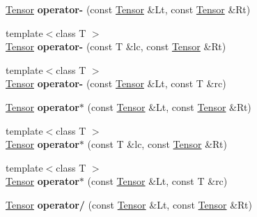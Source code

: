 \begin{DoxyCompactItemize}
\mbox{\label{namespacecytnx_a5a476408cdb97a10fa2330a5d6b4934c}} 
\hyperlink{classcytnx_1_1Tensor}{Tensor} {\bfseries operator-\/} (const \hyperlink{classcytnx_1_1Tensor}{Tensor} \&Lt, const \hyperlink{classcytnx_1_1Tensor}{Tensor} \&Rt)
\item 
\mbox{\label{namespacecytnx_a7c7bcfb0e14ec9e5317e686b955ea548}} 
{\footnotesize template$<$class T $>$ }\\\hyperlink{classcytnx_1_1Tensor}{Tensor} {\bfseries operator-\/} (const T \&lc, const \hyperlink{classcytnx_1_1Tensor}{Tensor} \&Rt)
\item 
\mbox{\label{namespacecytnx_a7c77b1fa99bea6e243e7e1dab2cb15ab}} 
{\footnotesize template$<$class T $>$ }\\\hyperlink{classcytnx_1_1Tensor}{Tensor} {\bfseries operator-\/} (const \hyperlink{classcytnx_1_1Tensor}{Tensor} \&Lt, const T \&rc)
\item 
\mbox{\label{namespacecytnx_ad579dd62bafd8261a0192a108b0f4b1b}} 
\hyperlink{classcytnx_1_1Tensor}{Tensor} {\bfseries operator$\ast$} (const \hyperlink{classcytnx_1_1Tensor}{Tensor} \&Lt, const \hyperlink{classcytnx_1_1Tensor}{Tensor} \&Rt)
\item 
\mbox{\label{namespacecytnx_ae1925a88cc713abd7d25ad548b7f7c22}} 
{\footnotesize template$<$class T $>$ }\\\hyperlink{classcytnx_1_1Tensor}{Tensor} {\bfseries operator$\ast$} (const T \&lc, const \hyperlink{classcytnx_1_1Tensor}{Tensor} \&Rt)
\item 
\mbox{\label{namespacecytnx_a5f0900c609bcf28f53091f403d8ea859}} 
{\footnotesize template$<$class T $>$ }\\\hyperlink{classcytnx_1_1Tensor}{Tensor} {\bfseries operator$\ast$} (const \hyperlink{classcytnx_1_1Tensor}{Tensor} \&Lt, const T \&rc)
\item 
\mbox{\label{namespacecytnx_aa12ec2394a750ba7e4c29799ec4bd53e}} 
\hyperlink{classcytnx_1_1Tensor}{Tensor} {\bfseries operator/} (const \hyperlink{classcytnx_1_1Tensor}{Tensor} \&Lt, const \hyperlink{classcytnx_1_1Tensor}{Tensor} \&Rt)
\item 
\mbox{\label{namespacecytnx_ac0b24a49371fb7bf2fc2992d1271a59d}} 

\end{DoxyCompactItemize}
